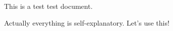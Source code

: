 \documentclass[10pt]{article}
\begin{document}
This is a test test document.

Actually everything is self-explanatory. Let's use this!
\end{document}
